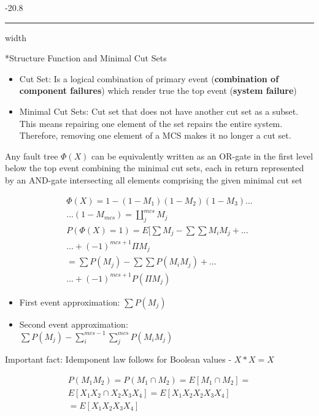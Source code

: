 \documentclass[8pt, landscape, fleqn]{scrartcl}
\makeatletter
\renewcommand{\subsubsection}{\@startsection{subsubsection}{1}{0mm}%
{-2\baselineskip}{0.8\baselineskip}%
{\hrule depth 0.2pt width\columnwidth\vspace*{1.2em}\normalsize\bfseries\rmfamily}}
\makeatother
\begin{document}
\begin{multicols*}{3}
\subsubsection*{Structure Function and Minimal Cut Sets}

\begin{itemize}
    \item Cut Set: Is a logical combination of primary event (\textbf{combination of component failures}) which render true the top event (\textbf{system failure})
    \item Minimal Cut Sets: Cut set that does not have another cut set as a subset. This means repairing one element of the set repairs the entire system. Therefore, removing one element of a MCS makes it no longer a cut set.
\end{itemize}

Any fault tree $\Phi(X)$ can be equivalently written as an OR-gate in the first level below the top event combining the minimal cut sets, each in return represented by
an AND-gate intersecting all elements comprising the given minimal cut set

\begin{align}
    \Phi(X) = 1- (1-M_1)(1-M_2)(1-M_3)...\\ ...(1-M_{mcs}) = \amalg^{mcs}_j M_j \\ P(\Phi(X)=1) = E[\sum M_j - \sum \sum M_i M_j+ ... \\ ... + (-1)^{mcs+1}\Pi M_j \\ = \sum P(M_j) - \sum \sum P(M_i M_j) + ... \\ ...+ (-1)^{mcs+1}P\left(\Pi M_j \right)
\end{align}

\begin{itemize}
    \item First event approximation: $\sum P(M_j)$
    \item Second event approximation: \\ $\sum P(M_j)-\sum_i^{mcs-1} \sum_j^{mcs} P(M_i M_j)$
\end{itemize}

Important fact: Idemponent law follows for Boolean values - $X * X = X$ 

\begin{align}
    P(M_1 M_2) = P(M_1 \cap M_2) = E[M_1 \cap M_2] = \\ E[X_1 X_2 \cap X_2 X_3 X_4] = E[X_1 X_2 X_2 X_3 X_4] \\ = E[X_1 X_2 X_3 X_4]
\end{align}


\end{multicols*}
\end{document}
